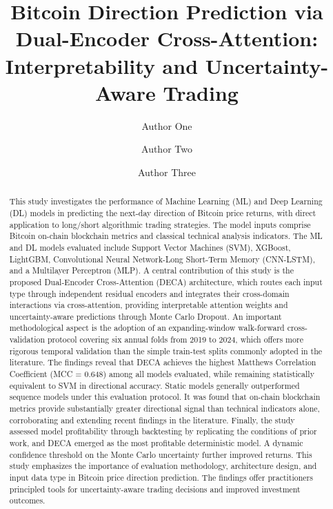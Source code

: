 \documentclass[final,3p,times,authoryear]{elsarticle}
\begin{document}
\begin{frontmatter}

\title{Bitcoin Direction Prediction via Dual-Encoder Cross-Attention:
  Interpretability and Uncertainty-Aware Trading}

\author[a]{Author One}

\author[a,b]{Author Two}

\author[a]{Author Three}


\address[a]{Department of Computer Science, University Name, City, Country}
\address[b]{Department of Finance, University Name, City, Country}

\begin{abstract}
This study investigates the performance of Machine Learning (ML) and Deep
Learning (DL) models in predicting the next-day direction of Bitcoin price
returns, with direct application to long/short algorithmic trading strategies.
The model inputs comprise Bitcoin on-chain blockchain metrics and classical
technical analysis indicators.
The ML and DL models evaluated include Support Vector Machines (SVM), XGBoost,
LightGBM, Convolutional Neural Network-Long Short-Term Memory (CNN-LSTM), and
a Multilayer Perceptron (MLP).
A central contribution of this study is the proposed Dual-Encoder
Cross-Attention (DECA) architecture, which routes each input type through
independent residual encoders and integrates their cross-domain interactions
via cross-attention, providing interpretable attention weights and
uncertainty-aware predictions through Monte Carlo Dropout.
An important methodological aspect is the adoption of an expanding-window
walk-forward cross-validation protocol covering six annual folds from 2019
to 2024, which offers more rigorous temporal validation than the simple
train-test splits commonly adopted in the literature.
The findings reveal that DECA achieves the highest Matthews Correlation
Coefficient (MCC = 0.648) among all models evaluated, while remaining
statistically equivalent to SVM in directional accuracy.
Static models generally outperformed sequence models under this evaluation
protocol.
It was found that on-chain blockchain metrics provide substantially greater
directional signal than technical indicators alone, corroborating and extending
recent findings in the literature.
Finally, the study assessed model profitability through backtesting by
replicating the conditions of prior work, and DECA emerged as the most
profitable deterministic model.
A dynamic confidence threshold on the Monte Carlo uncertainty further improved
returns.
This study emphasizes the importance of evaluation methodology, architecture
design, and input data type in Bitcoin price direction prediction.
The findings offer practitioners principled tools for uncertainty-aware trading
decisions and improved investment outcomes.
\end{abstract}


\end{frontmatter}
\end{document}
